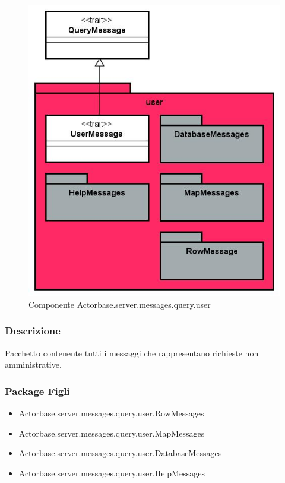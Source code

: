 \documentclass[a4paper]{article}
\begin{document}
			\begin{figure}[H]
				\centering
				\includegraphics[scale=0.70]{ST/Server/userLevel}
				\caption{Componente Actorbase.server.messages.query.user}
			\end{figure}
			
			\subsubsection{Descrizione}
				Pacchetto contenente tutti i messaggi che rappresentano richieste non amministrative.
				
			\subsubsection{Package Figli}
				\begin{itemize}
					\item Actorbase.server.messages.query.user.RowMessages
					\item Actorbase.server.messages.query.user.MapMessages
					\item Actorbase.server.messages.query.user.DatabaseMessages
					\item Actorbase.server.messages.query.user.HelpMessages
				\end{itemize}
				
\end{document}
